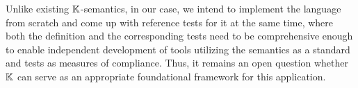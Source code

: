 Unlike existing $\mathbb{K}$-semantics,
in our case, we intend to implement the language from scratch
and come up with reference tests for it at the same time,
where both the definition and the corresponding tests
need to be comprehensive enough to enable independent development
of tools utilizing the semantics as a standard and tests as measures
of compliance. Thus, it remains an open question whether $\mathbb{K}$ can
serve as an appropriate foundational framework for this application.

